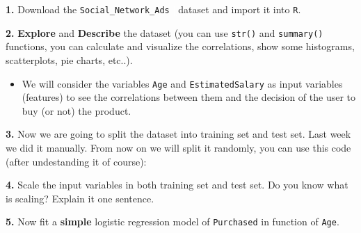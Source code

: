 \documentclass[]{book}
\newenvironment{Shaded}{\begin{snugshade}}{\end{snugshade}}
\newcommand{\KeywordTok}[1]{\textcolor[rgb]{0.13,0.29,0.53}{\textbf{#1}}}
\newcommand{\DataTypeTok}[1]{\textcolor[rgb]{0.13,0.29,0.53}{#1}}
\newcommand{\DecValTok}[1]{\textcolor[rgb]{0.00,0.00,0.81}{#1}}
\newcommand{\FloatTok}[1]{\textcolor[rgb]{0.00,0.00,0.81}{#1}}
\newcommand{\StringTok}[1]{\textcolor[rgb]{0.31,0.60,0.02}{#1}}
\newcommand{\CommentTok}[1]{\textcolor[rgb]{0.56,0.35,0.01}{\textit{#1}}}
\newcommand{\OtherTok}[1]{\textcolor[rgb]{0.56,0.35,0.01}{#1}}
\newcommand{\OperatorTok}[1]{\textcolor[rgb]{0.81,0.36,0.00}{\textbf{#1}}}
\newcommand{\NormalTok}[1]{#1}
\newenvironment{rmdblock}[1]
  {\begin{shaded*}
  \begin{itemize}
  \renewcommand{\labelitemi}{
    \raisebox{-.7\height}[0pt][0pt]{
      {\setkeys{Gin}{width=2em,keepaspectratio}\texttt{[image: img/icons/\#1]}}
    }
  }
  \item
  }
  {
  \end{itemize}
  \end{shaded*}
  }
\newenvironment{rmdtip}
  {\begin{rmdblock}{tip}}
  {\end{rmdblock}}
\theoremstyle{definition}
\theoremstyle{definition}
\theoremstyle{definition}
\theoremstyle{remark}
\begin{document}
\textbf{1.} Download the \texttt{Social\_Network\_Ads}
\textcolor{white}{[}\faTable\textcolor{white}{]}dataset and import it
into \texttt{R}.

\textbf{2.} \textbf{Explore} and \textbf{Describe} the dataset (you can
use \texttt{str()} and \texttt{summary()} functions, you can calculate
and visualize the correlations, show some histograms, scatterplots, pie
charts, etc..).

\begin{rmdtip}
We will consider the variables \texttt{Age} and \texttt{EstimatedSalary}
as input variables (features) to see the correlations between them and
the decision of the user to buy (or not) the product.
\end{rmdtip}

\textbf{3.} Now we are going to split the dataset into training set and
test set. Last week we did it manually. From now on we will split it
randomly, you can use this code (after undestanding it of course):

\begin{Shaded}
\end{Shaded}

\textbf{4.} Scale the input variables in both training set and test set.
Do you know what is scaling? Explain it one sentence.

\textbf{5.} Now fit a \textbf{simple} logistic regression model of
\texttt{Purchased} in function of \texttt{Age}.
\end{document}
